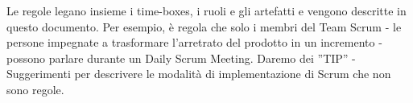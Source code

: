 Le regole legano insieme i time-boxes, i ruoli e gli artefatti e vengono descritte in questo documento.
Per  esempio, \`e regola  che solo  i membri  del Team  Scrum -  le persone
impegnate a  trasformare l'arretrato  del prodotto  in un  incremento -  possono
parlare durante un Daily Scrum Meeting. Daremo dei ''TIP'' - Suggerimenti per descrivere
le modalit\`a di implementazione di  Scrum che non sono regole.
\vspace{0.4cm}

